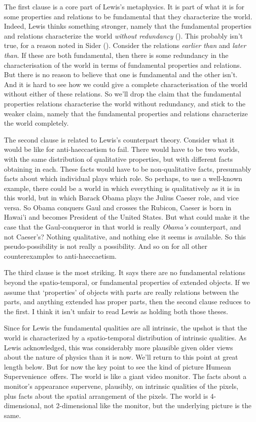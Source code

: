 \documentclass[
  10pt,
  letterpaper,
  DIV=11,
  numbers=noendperiod,
  twoside]{scrartcl}
\begin{document}
The first clause is a core part of Lewis's metaphysics. It is part of
what it is for some properties and relations to be fundamental that they
characterize the world. Indeed, Lewis thinks something stronger, namely
that the fundamental properties and relations characterize the world
\emph{without redundancy} ().
This probably isn't true, for a reason noted in Sider
(). Consider the relations \emph{earlier
than} and \emph{later than}. If these are both fundamental, then there
is some redundancy in the characterisation of the world in terms of
fundamental properties and relations. But there is no reason to believe
that one is fundamental and the other isn't. And it is hard to see how
we could give a complete characterisation of the world without either of
these relations. So we'll drop the claim that the fundamental properties
relations characterise the world without redundancy, and stick to the
weaker claim, namely that the fundamental properties and relations
characterize the world completely.

The second clause is related to Lewis's counterpart theory. Consider
what it would be like for anti-haeccaetism to fail. There would have to
be two worlds, with the same distribution of qualitative properties, but
with different facts obtaining in each. These facts would have to be
non-qualitative facts, presumably facts about which individual plays
which role. So perhaps, to use a well-known example, there could be a
world in which everything is qualitatively as it is in this world, but
in which Barack Obama plays the Julius Caeser role, and vice versa. So
Obama conquers Gaul and crosses the Rubicon, Caeser is born in Hawai'i
and becomes President of the United States. But what could make it the
case that the Gaul-conqueror in that world is really \emph{Obama's}
counterpart, and not Caeser's? Nothing qualitative, and nothing else it
seems is available. So this pseudo-possibility is not really a
possibility. And so on for all other counterexamples to
anti-haeccaetism.

The third clause is the most striking. It says there are no fundamental
relations beyond the spatio-temporal, or fundamental properties of
extended objects. If we assume that `properties' of objects with parts
are really relations between the parts, and anything extended has proper
parts, then the second clause reduces to the first. I think it isn't
unfair to read Lewis as holding both those theses.

Since for Lewis the fundamental qualities are all intrinsic, the upshot
is that the world is characterized by a spatio-temporal distribution of
intrinsic qualities. As Lewis acknowledged, this was considerably more
plausible given older views about the nature of physics than it is now.
We'll return to this point at great length below. But for now the key
point to see the kind of picture Humean Supervenience~offers. The world
is like a giant video monitor. The facts about a monitor's appearance
supervene, plausibly, on intrinsic qualities of the pixels, plus facts
about the spatial arrangement of the pixels. The world is 4-dimensional,
not 2-dimensional like the monitor, but the underlying picture is the
same.
\end{document}
